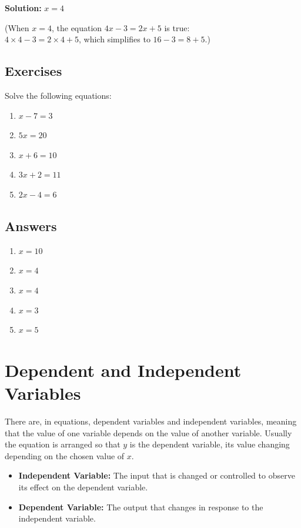 \documentclass[12pt]{article}
\begin{document}
\textbf{Solution:} \( x = 4 \)

(When \( x = 4 \), the equation \( 4x - 3 = 2x + 5 \) is true:\\ \( 4 \times 4 - 3 = 2 \times 4 + 5 \), which simplifies to $16-3=8+5$.)

\newpage

\subsection*{Exercises}

Solve the following equations:

\begin{enumerate}
    \item \( x - 7 = 3 \)
    \item \( 5x = 20 \)
    \item \( x + 6 = 10 \)
    \item \( 3x + 2 = 11 \)
    \item \( 2x - 4 = 6 \)
\end{enumerate}

\subsection*{Answers}

\begin{enumerate}
    \item \( x = 10 \)
    \item \( x = 4 \)
    \item \( x = 4 \)
    \item \( x = 3 \)
    \item \( x = 5 \)
\end{enumerate}

\newpage

\section*{Dependent and Independent Variables}
There are, in equations, dependent variables and independent variables, meaning that the value of one variable depends on the value of another variable. Usually the equation is arranged so that $y$ is the dependent variable, its value changing depending on the chosen value of $x$.

\begin{itemize}
    \item \textbf{Independent Variable:} The input that is changed or controlled to observe its effect on the dependent variable.
    \item \textbf{Dependent Variable:} The output that changes in response to the independent variable.
\end{itemize}
\end{document}
